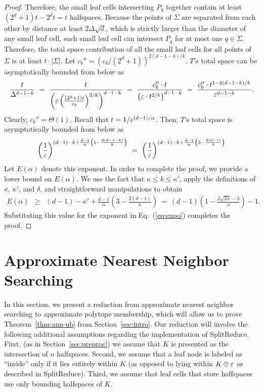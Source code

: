 \documentclass[11pt]{article}   \usepackage[letterpaper,hmargin=2.1cm,vmargin=3cm]{geometry}
\newcommand{\inv}[1]{\frac{1}{#1}}
\newcommand{\alg}{\textrm{SplitReduce}}
\begin{document}
\begin{proof}
Therefore, the small leaf cells intersecting $P_q$ together contain at least $(2^d + 1) t - 2^d t = t$ halfspaces. Because the points of $\Sigma$ are separated from each other by distance at least $2\Delta\sqrt{d}$, which is strictly larger than the diameter of any small leaf cell, each small leaf cell can intersect $P_q$ for at most one $q \in \Sigma$. Therefore, the total space contribution of all the small leaf cells for all points of $\Sigma$ is at least $t \cdot |\Sigma|$. Let $c_b'' = (c_b/(2^d+1))^{2(d-1-k)/k}$. $T$'s total space can be asymptotically bounded from below as
\[
	\frac{t}{\Delta^{d-1-k}}
		~ = ~ \frac{t}{\left(\varepsilon\left(\frac{(2^d+1)t}{c_b}\right)^{2/k}\right)^{d-1-k}}
		~ = ~ \frac{c_b'' \cdot t}{\left(\varepsilon \cdot t^{2/k}\right)^{d-1-k}}
		~ = ~ \frac{c_b'' \cdot t^{1 - 2 (d-1-k)/k}}{\varepsilon^{d-1-k}}.
\]
Clearly, $c_b'' = \Theta(1)$. Recall that $t = 1/\varepsilon^{(d-1)/\alpha}$. Then, $T$'s total space is asymptotically bounded from below as
\begin{equation}
	\left(\inv{\eps}\right)^{(d-1) - k + \frac{d-1}{\alpha}\left(1 - \frac{2 (d-1-k)}{k}\right)}
	~ = ~ \left(\inv{\eps}\right)^{(d-1) - k + \frac{d-1}{\alpha}\left(3 - \frac{2(d-1)}{k}\right)} \label{eq:expo}
\end{equation}
Let $E(\alpha)$ denote this exponent. In order to complete the proof, we provide a lower bound on $E(\alpha)$. We use the fact that $\kappa \le k \le \kappa'$, apply the definitions of $\kappa$, $\kappa'$, and $\delta$, and straightforward manipulations to obtain
\begin{eqnarray*}
	E(\alpha)
		& \ge & (d-1) - \kappa' + \frac{d-1}{\alpha}\left(3 - \frac{2(d-1)}{\kappa}\right)
		~  =  ~ (d-1) \left(1 - \frac{2\sqrt{2\alpha} - 3}{\alpha} \right) - 1.
\end{eqnarray*}
Substituting this value for the exponent in Eq.~(\ref{eq:expo}) completes the proof.
\end{proof}


\section{Approximate Nearest Neighbor Searching} \label{sec:ann}


In this section, we present a reduction from approximate nearest neighbor searching to approximate polytope membership, which will allow us to prove Theorem~\ref{thm:ann-ub} from Section~\ref{sec:intro}. Our reduction will involve the following additional assumptions regarding the implementation of {\alg}. First, (as in Section~\ref{sec:preproc}) we assume that $K$ is presented as the intersection of $n$ halfspaces. Second, we assume that a leaf node is labeled as ``inside'' only if it lies entirely within $K$ (as opposed to lying within $K \oplus \varepsilon$ as described in {\alg}). Third, we assume that leaf cells that store halfspaces use only bounding halfspaces of $K$.
\end{document}
